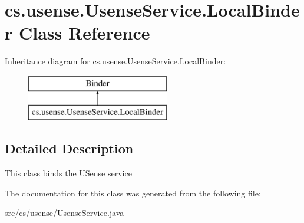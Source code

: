 \hypertarget{classcs_1_1usense_1_1_usense_service_1_1_local_binder}{}\section{cs.\+usense.\+Usense\+Service.\+Local\+Binder Class Reference}
\label{classcs_1_1usense_1_1_usense_service_1_1_local_binder}
Inheritance diagram for cs.\+usense.\+Usense\+Service.\+Local\+Binder\+:\begin{figure}[H]
\begin{center}
\leavevmode
\includegraphics[height=2.000000cm]{classcs_1_1usense_1_1_usense_service_1_1_local_binder}
\end{center}
\end{figure}


\subsection{Detailed Description}
This class binds the U\+Sense service 

The documentation for this class was generated from the following file\+:\begin{DoxyCompactItemize}
\item 
src/cs/usense/\hyperlink{_usense_service_8java}{Usense\+Service.\+java}\end{DoxyCompactItemize}

